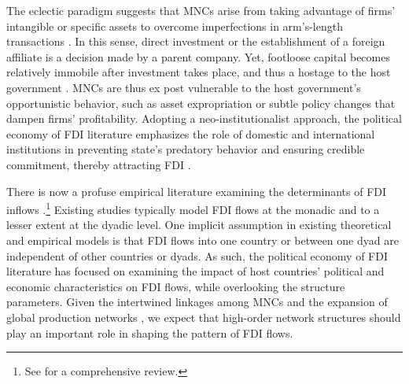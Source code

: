 \documentclass[reqno,onecolumn,letterpaper,12pt]{article}
\begin{document}
The eclectic paradigm suggests that MNCs arise from taking advantage of firms' intangible or specific assets to overcome imperfections in arm's-length transactions \citep{Dunning:1988,Dunning:1992}. In this sense, direct investment or the establishment of a foreign affiliate is a decision made by a parent company. Yet, footloose capital becomes relatively immobile after investment takes place, and thus a hostage to the host government \citep{Vernon:1971,Vernon:1980}. MNCs are thus ex post vulnerable to the host government's opportunistic behavior, such as asset expropriation or subtle policy changes that dampen firms' profitability. Adopting a neo-institutionalist approach, the political economy of FDI literature emphasizes the role of domestic and international institutions in preventing state's predatory behavior and ensuring credible commitment, thereby attracting FDI \citep[e.g.][]{Henisz:2000,Jensen:2003,Jensen:2006,Li_Resnick:2003,Staats_Biglaiser:2012,Buthe_Milner:2008,Allee_Peinhardt:2011,Kerner:2009}.

There is now a profuse empirical literature examining the determinants of FDI inflows \citep[e.g.,][]{Noorbakhsh_et_al:2001,Yeaple:2003,Jensen:2003,Li_Resnick:2003,Buthe_Milner:2008,Li_Vashchilko:2010,Kerner:2009,Wright_Zhu:2017}.\footnote{See \citet{Pandya:2016} for a comprehensive review.} Existing studies typically model FDI flows at the monadic and to a lesser extent at the dyadic level. One implicit assumption in existing theoretical and empirical models is that FDI flows into one country or between one dyad are independent of other countries or dyads. As such, the political economy of FDI literature has focused on examining the impact of host countries' political and   economic characteristics on FDI flows, while overlooking the structure parameters. Given the intertwined linkages among MNCs and the expansion of global production networks \citep{UNCTAD:2013}, we expect that high-order network structures should play an important role in shaping the pattern of FDI flows.
\end{document}
